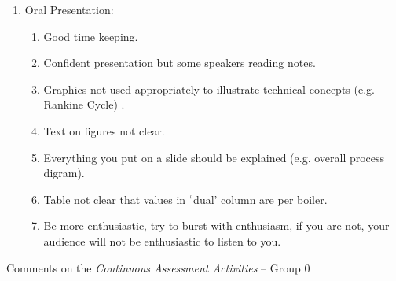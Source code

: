 \documentclass[14pt,twoside]{report}
\begin{document}
\begin{enumerate}
\item Oral Presentation:
\begin{enumerate}
%
\item Good time keeping.
%
\item Confident presentation but some speakers reading notes.
%
\item Graphics not used appropriately to illustrate technical concepts (e.g. Rankine Cycle) .
%
\item Text on figures not clear.
%
\item Everything you put on a slide should be explained (e.g. overall process digram).
%
\item Table not clear that values in $\lq$dual' column are per boiler.
%
\item Be more enthusiastic, try to burst with enthusiasm, if you are not, your audience will not be enthusiastic to listen to you.
%
\end{enumerate}

\end{enumerate}


\clearpage


\clearpage



\bigskip

\begin{center}
  {\Large Comments on the {\it Continuous Assessment Activities} -- Group 0}
\end{center}
\end{document}
